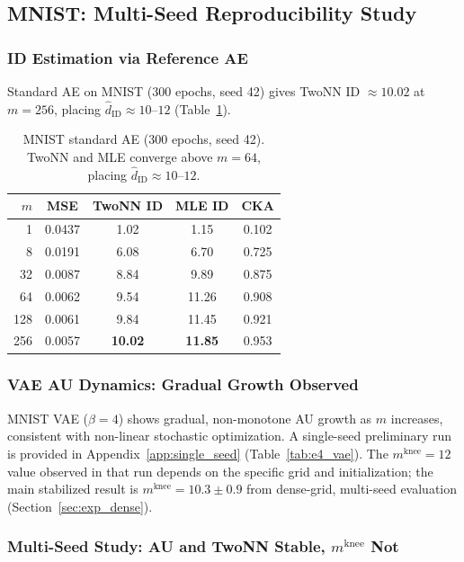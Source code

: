 \documentclass[make,article,submit,pdftex,moreauthors]{Definitions/mdpi}
\newcommand{\mknee}{m^{\mathrm{knee}}}
\newcommand{\hatdID}{\hat{d}_{\mathrm{ID}}}
\begin{document}
\subsection{MNIST: Multi-Seed Reproducibility Study}\label{sec:exp_mnist}

\subsubsection{ID Estimation via Reference AE}

Standard AE on MNIST (300 epochs, seed 42) gives TwoNN ID $\approx 10.02$
at $m = 256$, placing $\hatdID \approx 10$--$12$ (Table~\ref{tab:e4_ae}).

\begin{table}[H]
\caption{MNIST standard AE (300 epochs, seed 42).
TwoNN and MLE converge above $m = 64$, placing $\hatdID \approx 10$--$12$.}
\label{tab:e4_ae}
\small
\begin{tabular}{rcccc}
\toprule
$m$ & MSE & TwoNN ID & MLE ID & CKA \\
\midrule
1   & 0.0437 & 1.02  & 1.15  & 0.102 \\
8   & 0.0191 & 6.08  & 6.70  & 0.725 \\
32  & 0.0087 & 8.84  & 9.89  & 0.875 \\
64  & 0.0062 & 9.54  & 11.26 & 0.908 \\
128 & 0.0061 & 9.84  & 11.45 & 0.921 \\
256 & 0.0057 & \textbf{10.02} & \textbf{11.85} & 0.953 \\
\bottomrule
\end{tabular}
\end{table}

\subsubsection{VAE AU Dynamics: Gradual Growth Observed}
\label{sec:vae_au_dynamics}

MNIST VAE ($\beta = 4$) shows gradual, non-monotone AU growth as $m$
increases, consistent with non-linear stochastic optimization.
A single-seed preliminary run is provided in Appendix~\ref{app:single_seed}
(Table~\ref{tab:e4_vae}).
The $\mknee = 12$ value observed in that run depends on the specific grid
and initialization; the main stabilized result is $\mknee = 10.3 \pm 0.9$
from dense-grid, multi-seed evaluation
(Section~\ref{sec:exp_dense}).

\subsubsection{Multi-Seed Study: AU and TwoNN Stable, $\mknee$ Not}
\label{sec:exp_multiseed}
\end{document}

